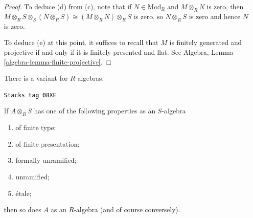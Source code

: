 \begin{proof}
\medskip\noindent
To deduce (d) from (c), note that if $N \in \text{Mod}_R$ and $M \otimes_R N$
is zero,
then $M \otimes_R S \otimes_S (N \otimes_R S) \cong (M \otimes_R N) \otimes_R
S$ is zero,
so $N \otimes_R S$ is zero and hence $N$ is zero.

\medskip\noindent
To deduce (e) at this point, it suffices to recall that $M$ is finitely
generated and projective if and only if it is finitely presented and flat.
See Algebra, Lemma \ref{algebra-lemma-finite-projective}.
\end{proof}

There is a variant for $R$-algebras.

\begin{theorem}
\label{descent-theorem-descend-algebra-properties}
\href{https://stacks.math.columbia.edu/tag/08XE}{\texttt{Stacks tag 08XE}}

If $A \otimes_R S$ has one of the following properties as an $S$-algebra
\begin{enumerate}
\item[(a)]
of finite type;
\item[(b)]
of finite presentation;
\item[(c)]
formally unramified;
\item[(d)]
unramified;
\item[(e)]
\'etale;
\end{enumerate}
then so does $A$ as an $R$-algebra (and of course conversely).
\end{theorem}


